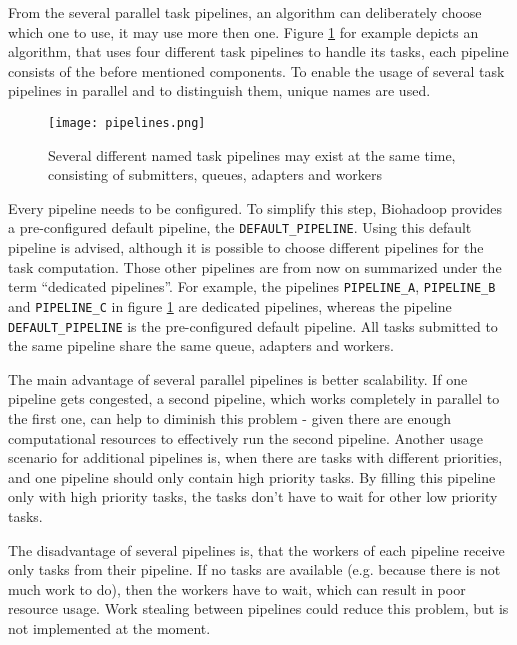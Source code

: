   From the several parallel task pipelines, an algorithm can deliberately choose which one to use, it may use more then one. Figure \ref{fig:pipelines} for example depicts an algorithm, that uses four different task pipelines to handle its tasks, each pipeline consists of the before mentioned components. To enable the usage of several task pipelines in parallel and to distinguish them, unique names are used.
  
  \begin{figure}[ht!]
    \centering
    \texttt{[image: pipelines.png]}
    \caption{Several different named task pipelines may exist at the same time, consisting of submitters, queues, adapters and workers}
    \label{fig:pipelines}
  \end{figure}

  Every pipeline needs to be configured. To simplify this step, Biohadoop provides a pre-configured default pipeline, the \texttt{DEFAULT\_PIPELINE}. Using this default pipeline is advised, although it is possible to choose different pipelines for the task computation. Those other pipelines are from now on summarized under the term ``dedicated pipelines''. For example, the pipelines \texttt{PIPELINE\_A}, \texttt{PIPELINE\_B} and \texttt{PIPELINE\_C} in figure \ref{fig:pipelines} are dedicated pipelines, whereas the pipeline \texttt{DEFAULT\_PIPELINE} is the pre-configured default pipeline. All tasks submitted to the same pipeline share the same queue, adapters and workers.
  
  The main advantage of several parallel pipelines is better scalability. If one pipeline gets congested, a second pipeline, which works completely in parallel to the first one, can help to diminish this problem - given there are enough computational resources to effectively run the second pipeline. Another usage scenario for additional pipelines is, when there are tasks with different priorities, and one pipeline should only contain high priority tasks. By filling this pipeline only with high priority tasks, the tasks don't have to wait for other low priority tasks.
  
  The disadvantage of several pipelines is, that the workers of each pipeline receive only tasks from their pipeline. If no tasks are available (e.g. because there is not much work to do), then the workers have to wait, which can result in poor resource usage. Work stealing \cite{blumofe1999scheduling} between pipelines could reduce this problem, but is not implemented at the moment.

